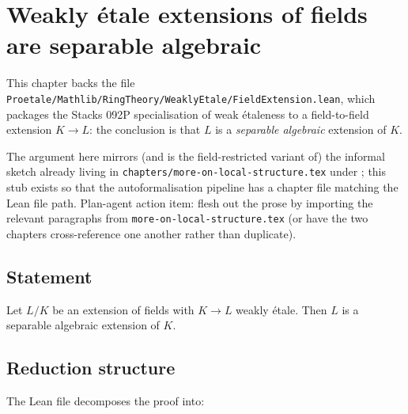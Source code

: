 \chapter{Weakly étale extensions of fields are separable algebraic}
\label{ch:mathlib-weakly-etale-fieldextension}

This chapter backs the file
\texttt{Proetale/Mathlib/RingTheory/WeaklyEtale/FieldExtension.lean},
which packages the Stacks 092P specialisation of weak étaleness to a
field-to-field extension $K \to L$: the conclusion is that $L$ is a
\emph{separable algebraic} extension of $K$.

The argument here mirrors (and is the field-restricted variant of) the
informal sketch already living in
\texttt{chapters/more-on-local-structure.tex} under
; this stub exists so
that the autoformalisation pipeline has a chapter file matching the Lean
file path. Plan-agent action item: flesh out the prose by importing the
relevant paragraphs from \texttt{more-on-local-structure.tex} (or have
the two chapters cross-reference one another rather than duplicate).

\section{Statement}

\begin{theorem}[\stacksproject{092P}]
  \label{thm:mathlib-weakly-etale-field-imples-separable-algebraic}
  \leanok
  Let $L / K$ be an extension of fields with $K \to L$ weakly étale.
  Then $L$ is a separable algebraic extension of $K$.
\end{theorem}

\section{Reduction structure}

The Lean file decomposes the proof into:

